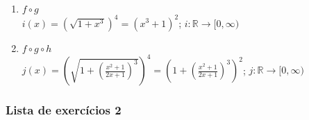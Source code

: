 \documentclass{article}
\begin{document}
\begin{enumerate}
    \begin{enumerate}
        \item $f \circ g$ \\ $i(x) = (\sqrt{1+x^3})^4 = (x^3 + 1)^2$; $i : \mathbb{R} \rightarrow [0, \infty)$
        \item $f \circ g \circ h$ \\ $j(x) = \left(\sqrt{1 + (\frac{x^2 + 1}{2x + 1})^3}\right)^4 = \left(1 + (\frac{x^2 + 1}{2x + 1})^3\right)^2$; $j : \mathbb{R} \rightarrow [0, \infty)$
    \end{enumerate}
\end{enumerate}

\newpage
\subsubsection*{Lista de exercícios 2}
\end{document}
